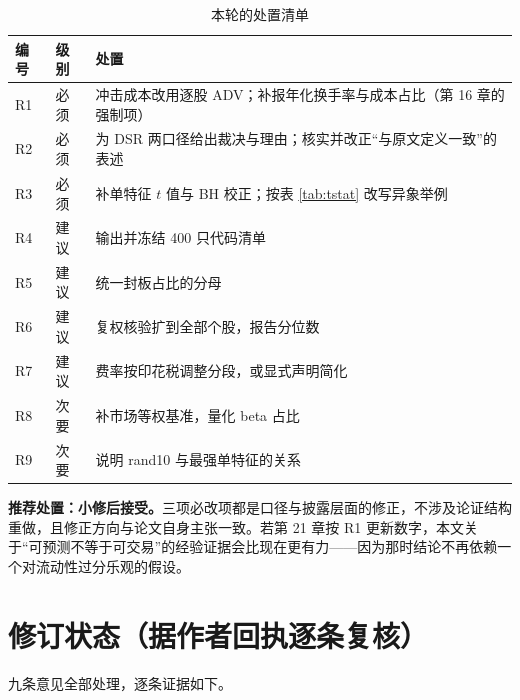 \documentclass[11pt,a4paper]{ctexart}
\begin{document}
\begin{table}[htbp]
\centering
\caption{本轮的处置清单}
\label{tab:actions}
\begin{tabular}{@{}>{\raggedright\arraybackslash}p{1.0cm}>{\raggedright\arraybackslash}p{4.0cm}>{\raggedright\arraybackslash}p{8.6cm}@{}}
\toprule
编号 & 级别 & 处置 \\
\midrule
R1 & 必须 & 冲击成本改用逐股 ADV；补报年化换手率与成本占比（第 16 章的强制项） \\
R2 & 必须 & 为 DSR 两口径给出裁决与理由；核实并改正“与原文定义一致”的表述 \\
R3 & 必须 & 补单特征 $t$ 值与 BH 校正；按表 \ref{tab:tstat} 改写异象举例 \\
R4 & 建议 & 输出并冻结 400 只代码清单 \\
R5 & 建议 & 统一封板占比的分母 \\
R6 & 建议 & 复权核验扩到全部个股，报告分位数 \\
R7 & 建议 & 费率按印花税调整分段，或显式声明简化 \\
R8 & 次要 & 补市场等权基准，量化 beta 占比 \\
R9 & 次要 & 说明 rand10 与最强单特征的关系 \\
\bottomrule
\end{tabular}
\end{table}

\textbf{推荐处置：小修后接受。}三项必改项都是口径与披露层面的修正，不涉及论证结构重做，且修正方向与论文自身主张一致。若第 21 章按 R1 更新数字，本文关于“可预测不等于可交易”的经验证据会比现在更有力——因为那时结论不再依赖一个对流动性过分乐观的假设。

\section{修订状态（据作者回执逐条复核）}

九条意见全部处理，逐条证据如下。
\end{document}
